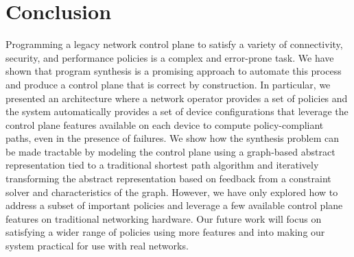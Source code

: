 \section{Conclusion}
Programming a legacy network control plane to satisfy a variety of
connectivity, security, and performance policies is a complex and error-prone
task. We have shown that program synthesis is a promising approach to automate
this process and produce a control plane that is correct by construction.
In particular, we presented an architecture where a network operator provides
a set of policies 
and the system automatically provides a set of device configurations that
leverage the control plane features available on each device to compute
policy-compliant paths, even in the presence of failures.  
We show how the synthesis problem can be made tractable 
 by modeling the control plane using a graph-based 
abstract representation tied to a traditional shortest path algorithm and
iteratively transforming the abstract representation based on feedback from
a constraint solver and characteristics of the graph. However, we
have only explored how to address a subset of important policies and leverage a
few available control plane features on traditional networking hardware. Our
future work will focus on satisfying a wider range of policies using more
features and into making our system practical for use with real networks.
